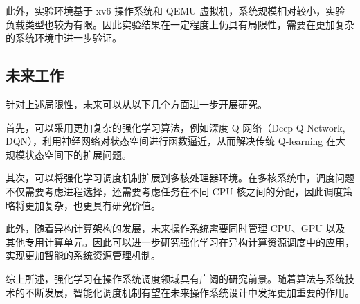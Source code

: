 此外，实验环境基于 xv6 操作系统和 QEMU 虚拟机，系统规模相对较小，实验负载类型也较为有限。因此实验结果在一定程度上仍具有局限性，需要在更加复杂的系统环境中进一步验证。

\subsection{未来工作}

针对上述局限性，未来可以从以下几个方面进一步开展研究。

首先，可以采用更加复杂的强化学习算法，例如深度 Q 网络（Deep Q Network, DQN），利用神经网络对状态空间进行函数逼近，从而解决传统 Q-learning 在大规模状态空间下的扩展问题。

其次，可以将强化学习调度机制扩展到多核处理器环境。在多核系统中，调度问题不仅需要考虑进程选择，还需要考虑任务在不同 CPU 核之间的分配，因此调度策略将更加复杂，也更具有研究价值。

此外，随着异构计算架构的发展，未来操作系统需要同时管理 CPU、GPU 以及其他专用计算单元。因此可以进一步研究强化学习在异构计算资源调度中的应用，实现更加智能的系统资源管理机制。

综上所述，强化学习在操作系统调度领域具有广阔的研究前景。随着算法与系统技术的不断发展，智能化调度机制有望在未来操作系统设计中发挥更加重要的作用。